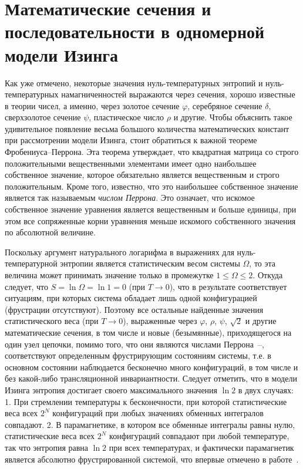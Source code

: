 \chapter{Математические сечения и последовательности в одномерной модели Изинга}\label{ch:ch5}

Как уже отмечено, некоторые значения нуль-температурных энтропий и нуль-температурных намагниченностей выражаются через сечения, хорошо известные в теории чисел, а именно, через золотое сечение $\varphi$, серебряное сечение $\delta$, сверхзолотое сечение $\psi$, пластическое число $\rho$ и другие. Чтобы объяснить такое удивительное появление весьма большого количества математических констант при рассмотрении модели Изинга, стоит обратиться к важной теореме Фробениуса--Перрона. Эта теорема утверждает, что квадратная матрица со строго положительными вещественными элементами имеет одно наибольшее собственное значение, которое обязательно является вещественным и строго положительным. Кроме того, известно, что это наибольшее собственное значение является так называемым \emph{числом Перрона}. Это означает, что искомое собственное значение уравнения является вещественным и больше единицы, при этом все сопряженные корни уравнения меньше искомого собственного значения по абсолютной величине. 

Поскольку аргумент натурального логарифма в выражениях для нуль-температурной энтропии является статистическим весом системы $\Omega$, то эта величина может принимать значение только в промежутке $1\leqslant \Omega\leqslant 2$. Откуда следует, что $S= \ln \Omega =  \ln 1 = 0$ (при $T \rightarrow 0$), что в результате соответствует ситуациям, при которых система обладает лишь одной конфигурацией (фрустрации отсутствуют). Поэтому все остальные найденные значения статистического веса (при $T \rightarrow 0$), выраженные через $\varphi$, $\rho$, $\psi$,  $\sqrt{2}$ и другие математические сечения, в том числе и новые (безымянные), приходящегося на один узел цепочки, помимо того, что они являются числами Перрона~\cite{wu2010}--\cite{boyd1985}, соответствуют определенным фрустрирующим состояниям системы, т.е. в основном состоянии наблюдается бесконечно много конфигураций, в том числе и без какой-либо трансляционной инвариантности. Следует отметить, что в модели Изинга энтропия достигает своего максимального значения $\ln 2$ в двух случаях: 1. При стремлении температуры к бесконечности, при которой статистические веса всех $2^N$ конфигураций при любых значениях обменных интегралов совпадают. 2. В парамагнетике, в котором все обменные интегралы равны нулю, статистические веса всех $2^N$ конфигураций совпадают при любой температуре, так что энтропия равна $\ln 2$ при всех температурах, и фактически парамагнетик является абсолютно фрустрированной системой, что впервые отмечено в работе~\cite{zarubin2019}. 

